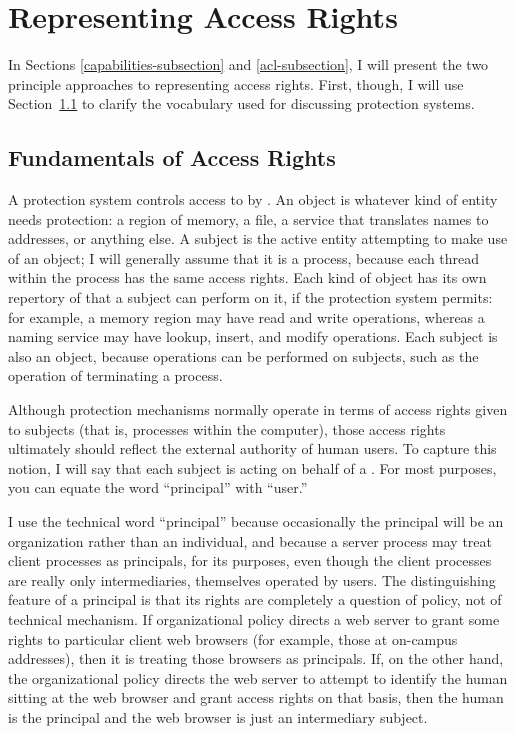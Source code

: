 \section{Representing Access Rights}\label{access-rights-section}

In Sections \ref{capabilities-subsection} and \ref{acl-subsection}, I will present the two principle
approaches to representing access rights.  First, though, I will
use Section~\ref{access-fundamentals-subsections} to clarify the vocabulary used for discussing
protection systems.

\subsection{Fundamentals of Access Rights}\label{access-fundamentals-subsections}

A protection system controls access to  by
.  An object is whatever kind of entity needs
protection: a region of memory, a file, a service that translates
names to addresses, or anything else.  
A subject is the active entity
attempting to make use of an object; I will generally assume that it is
a process, because each thread within the process has the same access
rights.
Each kind of object has its own
repertory of  that a subject can perform on it, if
the protection system permits: for example, a memory region may have
read and write operations, whereas a naming service may have lookup,
insert, and modify operations.  Each subject is also an object,
because operations can be performed on subjects, such as the operation
of terminating a process.

Although protection mechanisms normally operate in terms of access
rights given to subjects (that is, processes within the computer), those
access rights ultimately should reflect the external authority of
human users.  To capture this notion, I will say that each subject is
acting on behalf of a . For most purposes, you can
equate the word ``principal'' with ``user.''

I use the technical word ``principal'' because occasionally the
principal will be an organization rather than an individual, and
because a server process may treat client processes as principals, for
its purposes, even though the client processes are really only
intermediaries, themselves operated by users.  The distinguishing
feature of a principal is that its rights are completely a question of
policy, not of technical mechanism.  If organizational policy directs
a web server to grant some rights to particular client web browsers
(for example, those at on-campus addresses), then it is treating those
browsers as principals.  If, on the other hand, the organizational
policy directs the web server to attempt to identify the human sitting
at the web browser and grant access rights on that basis, then the
human is the principal and the web browser is just an intermediary
subject.


